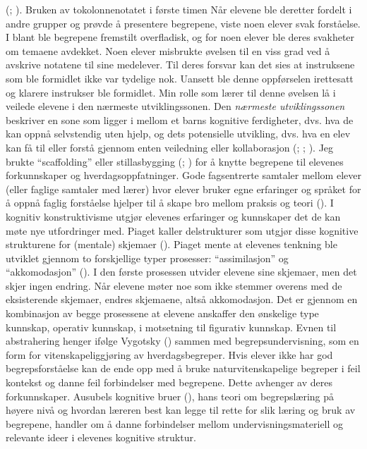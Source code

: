 \documentclass[main.tex]{subfiles}
\begin{document}
(; ). Bruken av tokolonnenotatet i første timen 
\newline
\newline
Når elevene ble deretter fordelt i andre grupper og prøvde å presentere begrepene, viste noen elever 
svak forståelse. I blant ble begrepene fremstilt overfladisk, og for noen elever ble deres svakheter 
om temaene avdekket. Noen elever misbrukte øvelsen til en viss grad ved å avskrive notatene til sine 
medelever. Til deres forsvar kan det sies at instruksene som ble formidlet ikke var tydelige nok. 
Uansett ble denne oppførselen irettesatt og klarere instrukser ble formidlet.
\newline
\newline
Min rolle som lærer til denne øvelsen lå i veilede elevene i den nærmeste utviklingssonen.
Den \emph{nærmeste utviklingssonen} beskriver en sone som ligger i mellom et barns kognitive 
ferdigheter, dvs. hva de kan oppnå selvstendig uten hjelp, og dets potensielle utvikling, dvs. 
hva en elev kan få til eller forstå gjennom enten veiledning eller kollaborasjon 
(; ; ). Jeg brukte ``scaffolding'' 
eller stillasbygging (; ) for å knytte begrepene til elevenes 
forkunnskaper og hverdagsoppfatninger. Gode fagsentrerte samtaler mellom elever (eller faglige samtaler 
med lærer) hvor elever bruker egne erfaringer og språket for å oppnå faglig forståelse hjelper til å 
skape bro mellom praksis og teori ().
\newline
\newline
I kognitiv konstruktivisme utgjør elevenes erfaringer og kunnskaper det de kan møte nye 
utfordringer med. Piaget kaller delstrukturer som utgjør disse kognitive strukturene 
for (mentale) skjemaer (). Piaget mente at elevenes tenkning ble 
utviklet gjennom to forskjellige typer prosesser: ``assimilasjon'' og ``akkomodasjon'' 
(). I den første prosessen utvider elevene sine skjemaer, men
det skjer ingen endring. Når elevene møter noe som ikke stemmer overens med de
eksisterende skjemaer, endres skjemaene, altså akkomodasjon. Det er gjennom en 
kombinasjon av begge prosessene at elevene anskaffer den ønskelige type kunnskap,
operativ kunnskap, i motsetning til figurativ kunnskap.
\newline
\newline
Evnen til abstrahering henger ifølge Vygotsky () sammen med begrepsundervisning, som en
form for vitenskapeliggjøring av hverdagsbegreper. Hvis elever ikke har god begrepsforståelse
kan de ende opp med å bruke naturvitenskapelige begreper i feil kontekst og danne feil 
forbindelser med begrepene. Dette avhenger av deres forkunnskaper. Ausubels kognitive bruer 
(), hans teori om begrepslæring på høyere nivå og hvordan læreren best kan 
legge til rette for slik læring og bruk av begrepene, handler om å danne forbindelser mellom 
undervisningsmateriell og relevante ideer i elevenes kognitive struktur.
\end{document}
